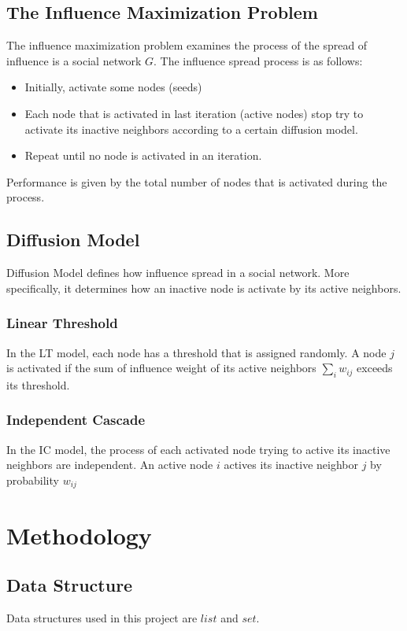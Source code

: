 \documentclass[conference]{IEEEtran}
\begin{document}
    \subsection{The Influence Maximization Problem}
    The influence maximization problem examines the process of the spread of influence is a social network $G$. The influence spread process is as follows:
    \begin{itemize}
        \item Initially, activate some nodes (seeds)
        \item Each node that is activated in last iteration (active nodes) stop try to activate its inactive neighbors according to a certain diffusion model.
        \item Repeat until no node is activated in an iteration.
    \end{itemize}
    Performance is given by the total number of nodes that is activated during the process.
    \subsection{Diffusion Model}
    Diffusion Model defines how influence spread in a social network. More specifically, it determines how an inactive node is activate by its active neighbors.

    \subsubsection{Linear Threshold}
    In the LT model, each node has a threshold that is assigned randomly. A node $j$ is activated if the sum of influence weight of its active neighbors $\sum\limits_{i}{w_{ij}}$ exceeds its threshold.

	\subsubsection{Independent Cascade}
    In the IC model, the process of each activated node trying to active its inactive neighbors are independent. An active node $i$ actives its inactive neighbor $j$ by probability $w_{ij}$

    \section{Methodology}
    \subsection{Data Structure}
    Data structures used in this project are $list$ and $set$.
\end{document}
